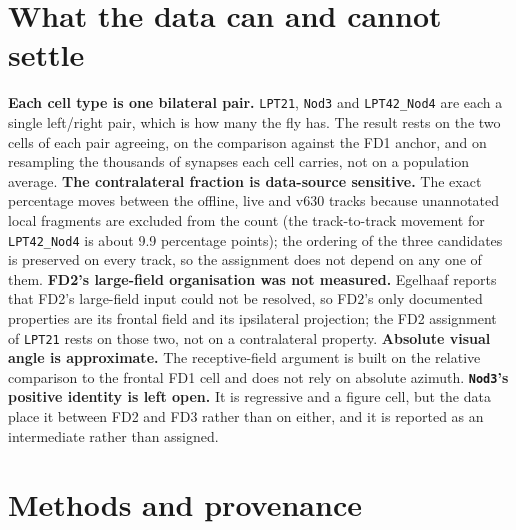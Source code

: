 \documentclass[11pt]{article}
\newcommand{\ttt}[1]{\texttt{#1}}
\begin{document}
\section{What the data can and cannot settle}

\textbf{Each cell type is one bilateral pair.} \ttt{LPT21}, \ttt{Nod3} and \ttt{LPT42\_Nod4} are each a single left/right pair, which is how many the fly has. The result rests on the two cells of each pair agreeing, on the comparison against the FD1 anchor, and on resampling the thousands of synapses each cell carries, not on a population average. \textbf{The contralateral fraction is data-source sensitive.} The exact percentage moves between the offline, live and v630 tracks because unannotated local fragments are excluded from the count (the track-to-track movement for \ttt{LPT42\_Nod4} is about 9.9 percentage points); the ordering of the three candidates is preserved on every track, so the assignment does not depend on any one of them. \textbf{FD2's large-field organisation was not measured.} Egelhaaf reports that FD2's large-field input could not be resolved, so FD2's only documented properties are its frontal field and its ipsilateral projection; the FD2 assignment of \ttt{LPT21} rests on those two, not on a contralateral property. \textbf{Absolute visual angle is approximate.} The receptive-field argument is built on the relative comparison to the frontal FD1 cell and does not rely on absolute azimuth. \textbf{\ttt{Nod3}'s positive identity is left open.} It is regressive and a figure cell, but the data place it between FD2 and FD3 rather than on either, and it is reported as an intermediate rather than assigned.

\section{Methods and provenance}
\end{document}

